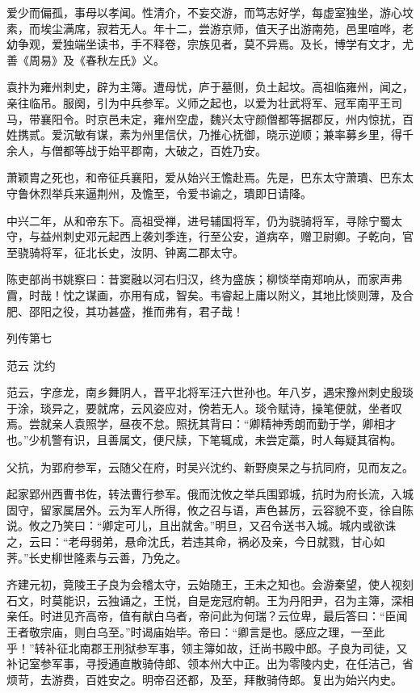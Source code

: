 \documentclass[12pt,UTF8]{ctexbook}
\begin{document}
爱少而偏孤，事母以孝闻。性清介，不妄交游，而笃志好学，每虚室独坐，游心坟素，而埃尘满席，寂若无人。年十二，尝游京师，值天子出游南苑，邑里喧哗，老幼争观，爱独端坐读书，手不释卷，宗族见者，莫不异焉。及长，博学有文才，尤善《周易》及《春秋左氏》义。

袁抃为雍州刺史，辟为主簿。遭母忧，庐于墓侧，负土起坟。高祖临雍州，闻之，亲往临吊。服阕，引为中兵参军。义师之起也，以爱为壮武将军、冠军南平王司马，带襄阳令。时京邑未定，雍州空虚，魏兴太守颜僧都等据郡反，州内惊扰，百姓携贰。爱沉敏有谋，素为州里信伏，乃推心抚御，晓示逆顺；兼率募乡里，得千余人，与僧都等战于始平郡南，大破之，百姓乃安。

萧颖胄之死也，和帝征兵襄阳，爱从始兴王憺赴焉。先是，巴东太守萧璝、巴东太守鲁休烈举兵来逼荆州，及憺至，令爱书谕之，璝即日请降。

中兴二年，从和帝东下。高祖受禅，进号辅国将军，仍为骁骑将军，寻除宁蜀太守，与益州刺史邓元起西上袭刘季连，行至公安，道病卒，赠卫尉卿。子乾向，官至骁骑将军，征北长史，汝阴、钟离二郡太守。

陈吏部尚书姚察曰：昔窦融以河右归汉，终为盛族；柳惔举南郑响从，而家声弗霣，时哉！忱之谋画，亦用有成，智矣。韦睿起上庸以附义，其地比惔则薄，及合肥、邵阳之役，其功甚盛，推而弗有，君子哉！





列传第七

范云 沈约

范云，字彦龙，南乡舞阴人，晋平北将军汪六世孙也。年八岁，遇宋豫州刺史殷琰于涂，琰异之，要就席，云风姿应对，傍若无人。琰令赋诗，操笔便就，坐者叹焉。尝就亲人袁照学，昼夜不怠。照抚其背曰：“卿精神秀朗而勤于学，卿相才也。”少机警有识，且善属文，便尺牍，下笔辄成，未尝定藁，时人每疑其宿构。

父抗，为郢府参军，云随父在府，时吴兴沈约、新野庾杲之与抗同府，见而友之。

起家郢州西曹书佐，转法曹行参军。俄而沈攸之举兵围郢城，抗时为府长流，入城固守，留家属居外。云为军人所得，攸之召与语，声色甚厉，云容貌不变，徐自陈说。攸之乃笑曰：“卿定可儿，且出就舍。”明旦，又召令送书入城。城内或欲诛之，云曰：“老母弱弟，悬命沈氏，若违其命，祸必及亲，今日就戮，甘心如荠。”长史柳世隆素与云善，乃免之。

齐建元初，竟陵王子良为会稽太守，云始随王，王未之知也。会游秦望，使人视刻石文，时莫能识，云独诵之，王悦，自是宠冠府朝。王为丹阳尹，召为主簿，深相亲任。时进见齐高帝，值有献白乌者，帝问此为何瑞？云位卑，最后答曰：“臣闻王者敬宗庙，则白乌至。”时谒庙始毕。帝曰：“卿言是也。感应之理，一至此乎！”转补征北南郡王刑狱参军事，领主簿如故，迁尚书殿中郎。子良为司徒，又补记室参军事，寻授通直散骑侍郎、领本州大中正。出为零陵内史，在任洁己，省烦苛，去游费，百姓安之。明帝召还都，及至，拜散骑侍郎。复出为始兴内史。
\end{document}

